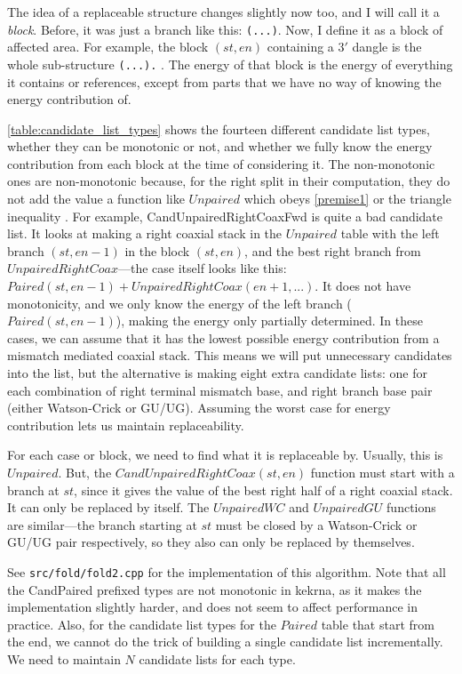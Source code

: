 \documentclass{cshonours}
\begin{document}
The idea of a replaceable structure changes slightly now too, and I will call it a \emph{block}. Before, it was just a branch like this: \texttt{(...)}. Now, I define it as a block of affected area. For example, the block $(st, en)$ containing a $3'$ dangle is the whole sub-structure \texttt{(...).} . The energy of that block is the energy of everything it contains or references, except from parts that we have no way of knowing the energy contribution of.

\autoref{table:candidate_list_types} shows the fourteen different candidate list types, whether they can be monotonic or not, and whether we fully know the energy contribution from each block at the time of considering it. The non-monotonic ones are non-monotonic because, for the right split in their computation, they do not add the value a function like $Unpaired$ which obeys \autoref{premise1} or the triangle inequality \cite{wexlerSparseFolding}. For example, CandUnpairedRightCoaxFwd is quite a bad candidate list. It looks at making a right coaxial stack in the $Unpaired$ table with the left branch $(st, en-1)$ in the block $(st, en)$, and the best right branch from $UnpairedRightCoax$---the case itself looks like this: $Paired(st, en - 1) + UnpairedRightCoax(en + 1, ...)$. It does not have monotonicity, and we only know the energy of the left branch ($Paired(st, en - 1)$), making the energy only partially determined. In these cases, we can assume that it has the lowest possible energy contribution from a mismatch mediated coaxial stack. This means we will put unnecessary candidates into the list, but the alternative is making eight extra candidate lists: one for each combination of right terminal mismatch base, and right branch base pair (either Watson-Crick or GU/UG). Assuming the worst case for energy contribution lets us maintain replaceability.

For each case or block, we need to find what it is replaceable by. Usually, this is $Unpaired$. But, the $CandUnpairedRightCoax(st, en)$ function must start with a branch at $st$, since it gives the value of the best right half of a right coaxial stack. It can only be replaced by itself. The $UnpairedWC$ and $UnpairedGU$ functions are similar---the branch starting at $st$ must be closed by a Watson-Crick or GU/UG pair respectively, so they also can only be replaced by themselves.

See \texttt{src/fold/fold2.cpp} for the implementation of this algorithm. Note that all the CandPaired prefixed types are not monotonic in kekrna, as it makes the implementation slightly harder, and does not seem to affect performance in practice. Also, for the candidate list types for the $Paired$ table that start from the end, we cannot do the trick of building a single candidate list incrementally. We need to maintain $N$ candidate lists for each type.
\end{document}
